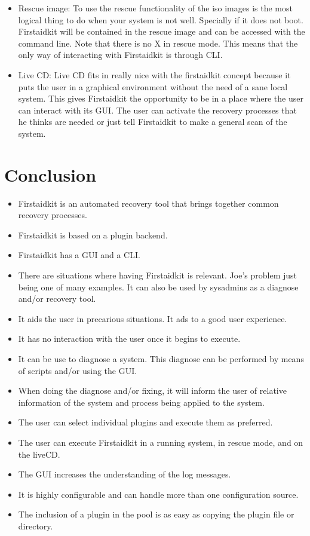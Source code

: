\documentclass[a4paper,13pt]{article}
\begin{document}
\begin{itemize}
\item Rescue image:
To use the rescue functionality of the iso images is the most logical thing to do when
your system is not well.  Specially if it does not boot.  Firstaidkit will be contained
in the rescue image and can be accessed with the command line.  Note that there is no X
in rescue mode.  This means that the only way of interacting with Firstaidkit is through
CLI.
\item Live CD:
Live CD fits in really nice with the firstaidkit concept because it puts the user in a
graphical environment without the need of a sane local system.  This gives Firstaidkit
the opportunity to be in a place where the user can interact with its GUI.  The user can
activate the recovery processes that he thinks are needed or just tell Firstaidkit to
make a general scan of the system.
\end{itemize}

\section{Conclusion}
\begin{itemize}
  \item Firstaidkit is an automated recovery tool that brings together common recovery
        processes.
  \item Firstaidkit is based on a plugin backend.
  \item Firstaidkit has a GUI and a CLI.
  \item There are situations where having Firstaidkit is relevant.  Joe's problem just
        being one of many examples.  It can also be used by sysadmins as a diagnose and/or
        recovery tool.
  \item It aids the user in precarious situations.  It ads to a good user experience.
  \item It has no interaction with the user once it begins to execute.
  \item It can be use to diagnose a system.  This diagnose can be performed by means of
        scripts and/or using the GUI.
  \item When doing the diagnose and/or fixing, it will inform the user of relative information
        of the system and process being applied to the system.
  \item The user can select individual plugins and execute them as preferred.
  \item The user can execute Firstaidkit in a running system, in rescue mode, and on the liveCD.
  \item The GUI increases the understanding of the log messages.
  \item It is highly configurable and can handle more than one configuration source.
  \item The inclusion of a plugin in the pool is as easy as copying the plugin file or directory.
\end{itemize}
\end{document}
